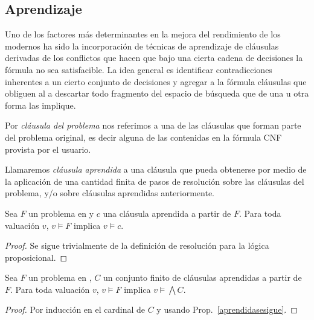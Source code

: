\subsection{Aprendizaje}
Uno de los factores más determinantes en la mejora del rendimiento de los \ssolver modernos ha sido la incorporación de técnicas de aprendizaje de cláusulas derivadas de los conflictos que hacen que bajo una cierta cadena de decisiones la fórmula no sea satisfacible. La idea general es identificar contradicciones inherentes a un cierto conjunto de decisiones y agregar a la fórmula cláusulas que obliguen al \ssolver a descartar todo fragmento del espacio de búsqueda que de una u otra forma las implique.

\begin{definition}
Por \emph{cláusula del problema} nos referimos a una de las cláusulas que forman parte del problema original, es decir alguna de las contenidas en la fórmula CNF provista por el usuario.
\end{definition}


\begin{definition}
Llamaremos \emph{cláusula aprendida} a una cláusula que pueda obtenerse por medio de la aplicación de una cantidad finita de pasos de resolución \cite{?} sobre las cláusulas del problema, y/o sobre cláusulas aprendidas anteriormente.
\end{definition}

\begin{proposition}\label{aprendidasesigue}
Sea $F$ un problema en \cnf y $c$ una cláusula aprendida a partir de $F$. Para toda valuación $v$, $v \models F$ implica $v \models c$.
\end{proposition}
\begin{proof}
Se sigue trivialmente de la definición de resolución para la lógica proposicional.
\end{proof}

\begin{proposition}\label{aprendidassesiguen}
Sea $F$ un problema en \cnf, $C$ un conjunto finito de cláusulas aprendidas a partir de $F$. Para toda valuación $v$, $v \models F$ implica $v \models \bigwedge C$.
\end{proposition}
\begin{proof}
Por inducción en el cardinal de $C$ y usando Prop.~\ref{aprendidasesigue}.
\end{proof}


